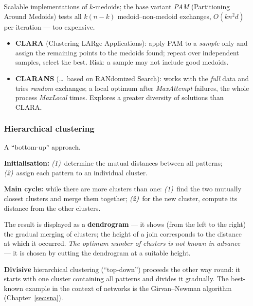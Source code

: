 \documentclass[11pt,a4paper]{article}
\theoremstyle{definition}
\providecommand{\uv}[1]{``#1''}
\begin{document}
\begin{defbox}
Scalable implementations of $k$-medoids; the base variant \emph{PAM} (Partitioning Around
Medoids) tests all $k(n-k)$ medoid--non-medoid exchanges, $O(kn^2d)$ per iteration --- too
expensive.
\begin{itemize}
\item \textbf{CLARA} (Clustering LARge Applications): apply PAM to a \emph{sample} only and
      assign the remaining points to the medoids found; repeat over independent samples,
      select the best. Risk: a sample may not include good medoids.
\item \textbf{CLARANS} (\dots\ based on RANdomized Search): works with the \emph{full} data
      and tries \emph{random} exchanges; a local optimum after \emph{MaxAttempt} failures,
      the whole process \emph{MaxLocal} times. Explores a greater diversity of solutions than
      CLARA.
\end{itemize}
\end{defbox}

\subsubsection{Hierarchical clustering}

\begin{defbox}
A \uv{bottom-up} approach.

\textbf{Initialisation:} \emph{(1)}~determine the mutual distances between all patterns;
\emph{(2)}~assign each pattern to an individual cluster.

\textbf{Main cycle:} while there are more clusters than one: \emph{(1)}~find the two mutually
closest clusters and merge them together; \emph{(2)}~for the new cluster, compute its distance from
the other clusters.

The result is displayed as a \textbf{dendrogram} --- it shows (from the left to the right) the
gradual merging of clusters; the height of a join corresponds to the distance at which it occurred.
\emph{The optimum number of clusters is not known in advance} --- it is chosen by cutting the
dendrogram at a suitable height.
\end{defbox}

\textbf{Divisive} hierarchical clustering (\uv{top-down}) proceeds the other way round: it starts
with one cluster containing all patterns and divides it gradually. The best-known example in the
context of networks is the Girvan--Newman algorithm (Chapter~\ref{sec:sna}).
\end{document}
